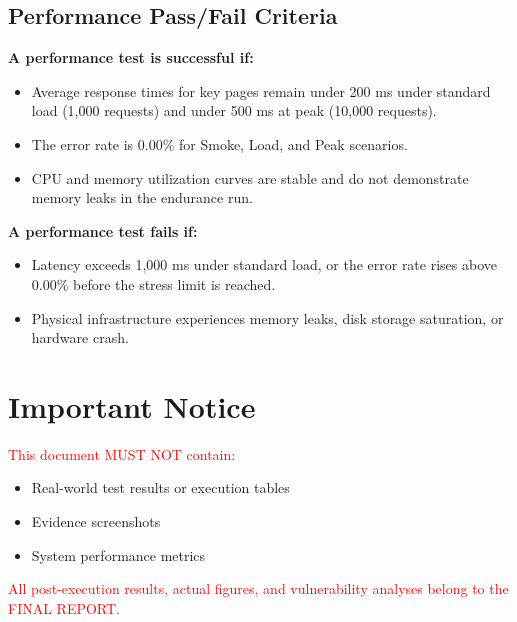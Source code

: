 \documentclass[12pt,a4paper]{article}
\newcommand{\important}[1]{\textcolor{red}{#1}} %
\begin{document}
\subsection{Performance Pass/Fail Criteria}
\textbf{A performance test is successful if:}
\begin{itemize}
\item Average response times for key pages remain under 200 ms under standard load (1,000 requests) and under 500 ms at peak (10,000 requests).
\item The error rate is 0.00\% for Smoke, Load, and Peak scenarios.
\item CPU and memory utilization curves are stable and do not demonstrate memory leaks in the endurance run.
\end{itemize}
\textbf{A performance test fails if:}
\begin{itemize}
\item Latency exceeds 1,000 ms under standard load, or the error rate rises above 0.00\% before the stress limit is reached.
\item Physical infrastructure experiences memory leaks, disk storage saturation, or hardware crash.
\end{itemize}

\section*{Important Notice}

\important{This document MUST NOT contain:}
\begin{itemize}
\item Real-world test results or execution tables
\item Evidence screenshots
\item System performance metrics
\end{itemize}

\important{All post-execution results, actual figures, and vulnerability analyses belong to the FINAL REPORT.}
\end{document}
